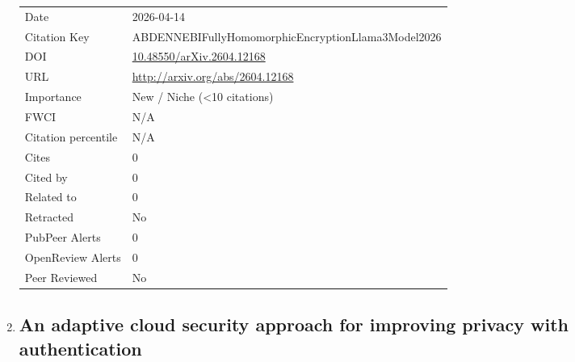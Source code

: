 \documentclass{article}
\begin{document}
\begin{enumerate}[label=\arabic*., font=\Large]
\begin{longtable}{p{} p{\contentcolwidth-2\tabcolsep}}
Date & 2026-04-14 \\
Citation Key & ABDENNEBIFullyHomomorphicEncryptionLlama3Model2026 \\
DOI & \href{http://doi.org/10.48550/arXiv.2604.12168}{10.48550/arXiv.2604.12168} \\
URL & \url{http://arxiv.org/abs/2604.12168} \\
Importance & New / Niche (<10 citations) \\
FWCI & N/A \\
Citation percentile & N/A \\
Cites & 0 \\
Cited by & 0 \\
Related to & 0 \\
Retracted & No \\
PubPeer Alerts & 0 \\
OpenReview Alerts & 0 \\
Peer Reviewed & No \\
\bottomrule
\end{longtable}

\item
{}\label{an-adaptive-cloud-security-approach-for-improving-privacy-with-authentication}
\hypertarget{item_SATHEESHAdaptiveCloudSecurityApproachImprovingPrivacy2026}{}
\subsection*{An adaptive cloud security approach for improving privacy with authentication}


\end{enumerate}
\end{document}
